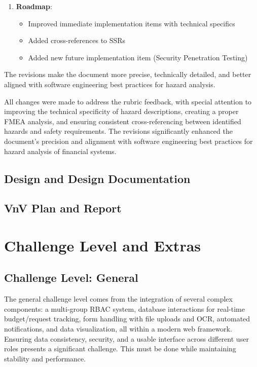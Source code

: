 \documentclass{article}
\begin{document}
\begin{enumerate}
  \item \textbf{Roadmap}:
  \begin{itemize}
    \item Improved immediate implementation items with technical specifics
    \item Added cross-references to SSRs
    \item Added new future implementation item (Security Penetration Testing)
  \end{itemize}
\end{enumerate}

\vspace{1em}
The revisions make the document more precise, technically detailed, and better aligned with software engineering best practices for hazard analysis.


All changes were made to address the rubric feedback, with special attention to improving the technical specificity of hazard descriptions, creating a proper FMEA analysis, and ensuring consistent cross-referencing between identified hazards and safety requirements. The revisions significantly enhanced the document's precision and alignment with software engineering best practices for hazard analysis of financial systems.

\subsection{Design and Design Documentation}

\subsection{VnV Plan and Report}

\section{Challenge Level and Extras}

\subsection{Challenge Level: General}
The general challenge level comes from the integration of several complex components: a multi-group RBAC system, database interactions for real-time budget/request tracking, form handling with file uploads and OCR, automated notifications, and data visualization, all within a modern web framework. Ensuring data consistency, security, and a usable interface across different user roles presents a significant challenge. This must be done while maintaining stability and performance.
\end{document}
